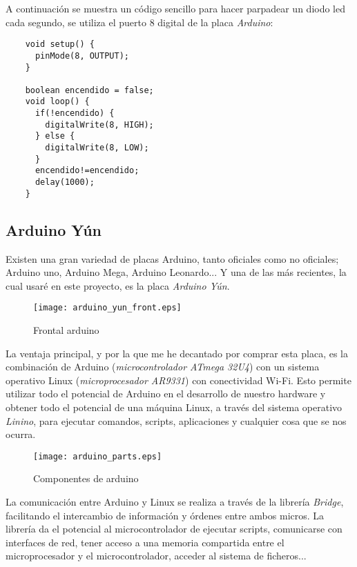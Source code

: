 A continuación se muestra un código sencillo para hacer parpadear un diodo led cada segundo, se utiliza el puerto 8 digital de la placa \emph{Arduino}:

\begin{lstlisting}
    void setup() {
      pinMode(8, OUTPUT);
    }

    boolean encendido = false;
    void loop() {
      if(!encendido) {
        digitalWrite(8, HIGH);
      } else {
        digitalWrite(8, LOW);
      }
      encendido!=encendido;
      delay(1000);
    }
\end{lstlisting}

\subsection{Arduino Yún}

Existen una gran variedad de placas Arduino, tanto oficiales como no oficiales; Arduino uno, Arduino Mega, Arduino Leonardo... Y una de las más recientes, la cual usaré en este proyecto, es la placa \emph{Arduino Yún}.

\begin{figure}[h!]
    \centering
    \texttt{[image: arduino\_yun\_front.eps]}
    \caption{Frontal arduino}\label{fig:arduino-yun-front}
\end{figure}

La ventaja principal, y por la que me he decantado por comprar esta placa, es la combinación de Arduino (\emph{microcontrolador ATmega 32U4}) con un sistema operativo Linux (\emph{microprocesador AR9331}) con conectividad Wi-Fi. Esto permite utilizar todo el potencial de Arduino en el desarrollo de nuestro hardware y obtener todo el potencial de una máquina Linux, a través del sistema operativo \emph{Linino}, para ejecutar comandos, scripts, aplicaciones y cualquier cosa que se nos ocurra.

\begin{figure}[h!]
    \centering
    \texttt{[image: arduino\_parts.eps]}
    \caption{Componentes de arduino}\label{fig:arduino-parts}
\end{figure}

La comunicación entre Arduino y Linux se realiza a través de la librería \emph{Bridge}, facilitando el intercambio de información y órdenes entre ambos micros. La librería da el potencial al microcontrolador de ejecutar scripts, comunicarse con interfaces de red, tener acceso a una memoria compartida entre el microprocesador y el microcontrolador, acceder al sistema de ficheros...

